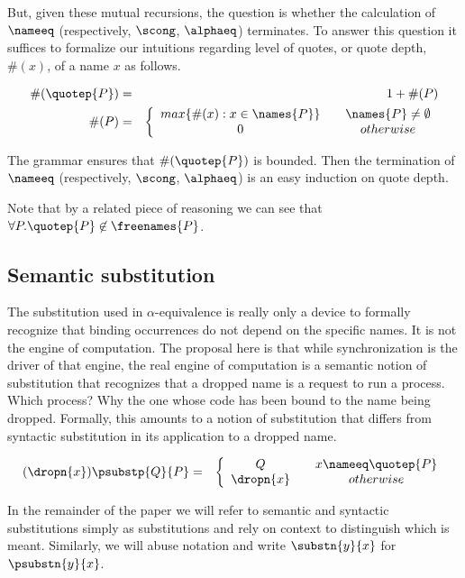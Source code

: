 But, given these mutual recursions, the question is whether the calculation
of $\nameeq$ (respectively, $\scong$, $\alphaeq$) terminates. To
answer this question it suffices to formalize our intuitions regarding
level of quotes, or quote depth, $\#(x)$, of a name $x$ as
follows.

\begin{eqnarray}
	\#(\quotep{P}) & = & 1 + \#(P) \nonumber\\
    \#(P) & = & \left\{
			   \begin{array}{ccc}
				 max\{ \#(x) : x \in \names{P} \} & & \names{P} \neq \emptyset \\
				 0 & & otherwise \\
			   \end{array}
			\right. \nonumber
\end{eqnarray}

The grammar ensures that $\#(\quotep{P})$ is bounded. Then the
termination of $\nameeq$ (respectively, $\scong$, $\alphaeq$) is an
easy induction on quote depth.

\begin{remark}
  Note that by a related piece of reasoning we can see that $\forall
  P. \quotep{P} \not\in \freenames{P}$.
\end{remark}

\subsection{Semantic substitution}

The substitution used in $\alpha$-equivalence is really only a device
to formally recognize that binding occurrences do not depend on the
specific names. It is not the engine of computation. The proposal here
is that while synchronization is the driver of that engine, the real
engine of computation is a semantic notion of substitution that
recognizes that a dropped name is a request to run a process. Which
process? Why the one whose code has been bound to the name being
dropped. Formally, this amounts to a notion of substitution that
differs from syntactic substitution in its application to a dropped
name.

\begin{eqnarray}
(\dropn{x})  \psubstp{Q}{P}       
		& = & 
		\left\{ 
			\begin{array}{ccc} 
				Q & & x \nameeq \quotep{P} \\
                              	\dropn{x} & & otherwise \\
			\end{array}
		\right. \nonumber
\end{eqnarray}

In the remainder of the paper we will refer to semantic and syntactic
substitutions simply as substitutions and rely on context to
distinguish which is meant. Similarly, we will abuse notation and
write $\substn{y}{x}$ for $\psubstn{y}{x}$.

